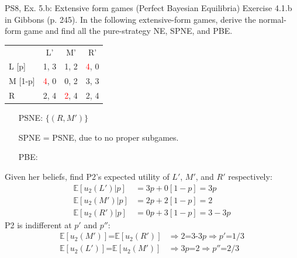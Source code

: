 \begin{frame}{PS8, Ex. 5.b: Extensive form games (Perfect Bayesian Equilibria)}
    Exercise 4.1.b in Gibbons (p. 245). In the following extensive-form games, derive the normal-form game and find all the pure-strategy NE, SPNE, and PBE.
    \vspace{-8pt}
    \begin{multicols}{2}
      \begin{table}
        \begin{tabular}{l|c|c|c|}
          \multicolumn{1}{c}{} & \multicolumn{1}{c}{L'} & \multicolumn{1}{c}{M'} & \multicolumn{1}{c}{R'} \\\cline{2-4}
          L [p]   & 1, \color{blue}3 & 1, 2 & \textcolor{red}{4}, 0 \\\cline{2-4}
          M [1-p] & \textcolor{red}{4}, 0 & 0, 2 & 3, \color{blue}3 \\\cline{2-4}
          R       & 2, \color{blue}4 & \textcolor{red}{2}, \color{blue}4 & 2, \color{blue}4 \\\cline{2-4}
        \end{tabular}
      \end{table} \vspace{-4pt}
      \begin{itemize}
        \item[PSNE:] $\{(R,M')\}$
        \item[SPNE =] PSNE, due to no proper subgames.
        \item[PBE:]
      \end{itemize} \vspace{-4pt}
      Given her beliefs, find P2's expected utility of $L'$, $M'$, and $R'$ respectively: \vspace{-4pt}
      \begin{align*}
        \mathbb{E}[u_2(L')|p]&=3p+0[1-p]=3p\\
        \mathbb{E}[u_2(M')|p]&=2p+2[1-p]=2\\
        \mathbb{E}[u_2(R')|p]&=0p+3[1-p]=3-3p
      \end{align*}
      P2 is indifferent at $p'$ and $p''$: \vspace{-4pt}
      \begin{align*}
        \mathbb{E}[u_2(M')]\text{=}\mathbb{E}[u_2(R')]&\Rightarrow 2\text{=3-3}p\Rightarrow p'\text{=}1/3\\
        \mathbb{E}[u_2(L')]\text{=}\mathbb{E}[u_2(M')]&\Rightarrow 3p\text{=}2\Rightarrow p''\text{=}2/3\\
      \end{align*}

\end{multicols}
\end{frame}
